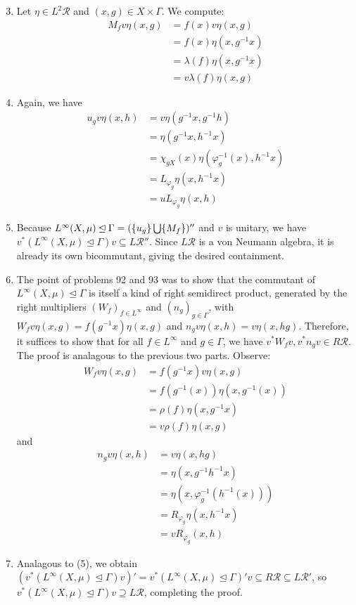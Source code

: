 \documentclass[a4paper,10pt]{report}
\DeclarePairedDelimiter{\set}{\{}{\}}
\begin{document}
\begin{enumerate}
\begin{enumerate}
				\setcounter{enumii}{2}
			\item Let $\eta\in L^2\mathcal{R}$ and $(x,g)\in X\times\Gamma$. We compute:
				\begin{align*}
					M_fv\eta(x,g) &= f(x)v\eta(x,g)\\
					&= f(x)\eta(x,g^{-1}x)\\
					&= \lambda(f)\eta(x,g^{-1}x)\\
					&= v\lambda(f)\eta(x,g)
				\end{align*}
			\item Again, we have 
				\begin{align*}
					u_gv\eta(x,h) &= v\eta(g^{-1}x,g^{-1}h)\\
					&= \eta(g^{-1}x,h^{-1}x)\\
					&= \chi_{gX}(x)\eta(\varphi_g^{-1}(x),h^{-1}x)\\
					&= L_{\varphi_g}\eta(x,h^{-1}x)\\
					&= uL_{\varphi_g}\eta(x,h)
				\end{align*}
			\item %
				Because $L^\infty(X,\mu)\unlhd\Gamma=(\set{u_g}\bigcup\set{M_f})''$ and $v$ is unitary, we have $v^*(L^\infty(X,\mu)\unlhd\Gamma)v\subseteq L\mathcal{R}''$. Since $L\mathcal{R}$ is a von Neumann algebra, it is already its own bicommutant, giving the desired containment. 
			\item The point of problems 92 and 93 was to show that the commutant of $L^\infty(X,\mu)\unlhd\Gamma$ is itself a kind of right semidirect product, generated by the right multipliers $(W_f)_{f\in L^\infty}$ and $(n_g)_{g\in\Gamma}$, with $W_fv\eta(x,g)=f(g^{-1}x)\eta(x,g)$ and $n_gv\eta(x,h)=v\eta(x,hg)$. %
				Therefore, it suffices to show that for all $f\in L^\infty$ and $g\in\Gamma$, we have $v^*W_fv,v^*n_gv\in R\mathcal{R}$. The proof is analagous to the previous two parts. Observe: 
				\begin{align*}
					W_fv\eta(x,g) &= f(g^{-1}x)v\eta(x,g)\\
					&= f(g^{-1}(x))\eta(x,g^{-1}(x))\\
					&= \rho(f)\eta(x,g^{-1}x)\\
					&= v\rho(f)\eta(x,g)
				\end{align*}
				and 
				\begin{align*}
					n_gv\eta(x,h) &= v\eta(x,hg)\\
					&= \eta(x,g^{-1}h^{-1}x)\\
					&= \eta(x,\varphi_g^{-1}(h^{-1}(x)))\\
					&= R_{\varphi_g}\eta(x,h^{-1}x)\\
					&= vR_{\varphi_g}(x,h)
				\end{align*}
			\item Analagous to (5), we obtain $(v^*(L^\infty(X,\mu)\unlhd\Gamma)v)'=v^*(L^\infty(X,\mu)\unlhd\Gamma)'v\subseteq R\mathcal{R}\subseteq L\mathcal{R}'$, so $v^*(L^\infty(X,\mu)\unlhd\Gamma)v\supseteq L\mathcal{R}$, completing the proof. 
		\end{enumerate}






\end{enumerate}
\end{document}
